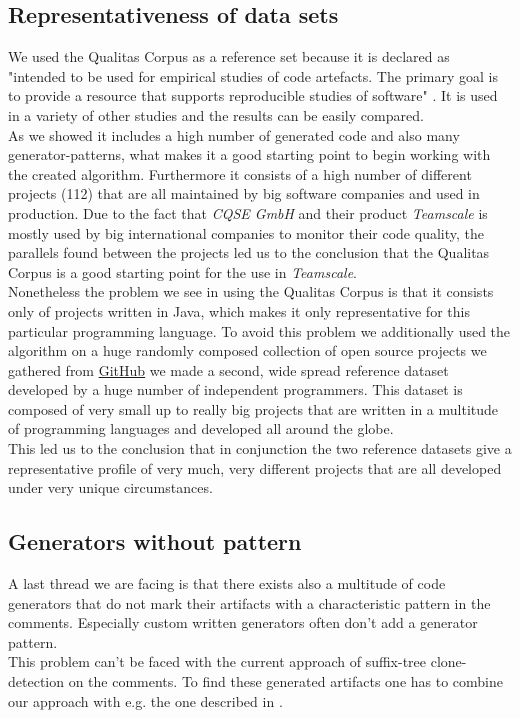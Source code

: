 \subsection{Representativeness of data sets}
We used the Qualitas Corpus as a reference set because it is declared as "intended to be used for empirical studies of code artefacts. The primary goal is to provide a resource that supports reproducible studies of software" \cite{TemperoEwanandAnslowCraigandDietrichJensandHanTedandLiJingandLumpeMarkusandMeltonHaydenandNoble2010a}. It is used in a variety of other studies and the results can be easily compared.\\
As we showed it includes a high number of generated code and also many generator-patterns, what makes it a good starting point to begin working with the created algorithm. Furthermore it consists of a high number of different projects (112) that are all maintained by big software companies and used in production. Due to the fact that \textit{CQSE GmbH} and their product \textit{Teamscale} is mostly used by big international companies to monitor their code quality, the parallels found between the projects led us to the conclusion that the Qualitas Corpus is a good starting point for the use in \textit{Teamscale}.\\
Nonetheless the problem we see in using the Qualitas Corpus is that it consists only of projects written in Java, which makes it only representative for this particular programming language. To avoid this problem we additionally used the algorithm on a huge randomly composed collection of open source projects we gathered from \href{github.com}{GitHub} we made a second, wide spread reference dataset developed by a huge number of independent programmers. This dataset is composed of very small up to really big projects that are written in a multitude of programming languages and developed all around the globe.\\
This led us to the conclusion that in conjunction the two reference datasets give a representative profile of very much, very different projects that are all developed under very unique circumstances.

\subsection{Generators without pattern}
A last thread we are facing is that there exists also a multitude of code generators that do not mark their artifacts with a characteristic pattern in the comments. Especially custom written generators often don't add a generator pattern.\\
This problem can't be faced with the current approach of suffix-tree clone-detection on the comments. To find these generated artifacts one has to combine our approach with e.g. the one described in \cite{Bernwieser2014}.